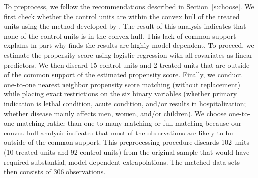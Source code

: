 \documentclass[11pt,titlepage]{article}
\begin{document}
To preprocess, we follow the recommendations described in
Section~\ref{s:choose}. We first check whether the control units are
within the convex hull of the treated units using the method developed
by \citet{KinZen06a}. The result of this analysis indicates that none
of the control units is in the convex hull. This lack of
common support explains in part why \citet{Carpenter02} finds the
results are highly model-dependent. To proceed, we estimate the
propensity score using logistic regression with all covariates as
linear predictors.  We then discard 15 control units and 2 treated
units that are outside of the common support of the estimated
propensity score. Finally, we conduct one-to-one nearest neighbor
propensity score matching (without replacement) while placing exact
restrictions on the six binary variables (whether primary indication
is lethal condition, acute condition, and/or results in
hospitalization; whether disease mainly affects men, women, and/or
children). We choose one-to-one matching rather than one-to-many
matching or full matching because our convex hull analysis indicates
that most of the observations are likely to be outside of the common
support.  This preprocessing procedure discards 102 units (10 treated
units and 92 control units) from the original sample that would have
required substantial, model-dependent extrapolations. The matched data
sets then consists of 306 observations.
\end{document}
